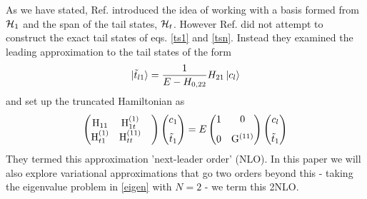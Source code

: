 \documentclass[twocolumn,secnumarabic,amssymb, nobibnotes, aps, prd]{revtex4-2}
\begin{document}
As we have stated, Ref. \cite{Elias-Miro:2017tup} introduced the idea of working with a basis formed from ${\cal H}_1$ and the span of the tail states, ${\cal H}_t$.  However Ref. \cite{Elias-Miro:2017tup} did not attempt to construct the exact tail states of eqs. \eqref{ts1} and \eqref{tsn}. Instead they examined the leading approximation to the tail states of the form
\begin{equation}
    \ket{\tilde t_{l1}}=\frac{1}{E-H_{0,22} }H_{21}\ket{c_l} \label{NLOtail}
\end{equation}
and set up the truncated Hamiltonian as
\begin{equation}\label{1st_tail_order}
\begin{pmatrix}
   {\rm H}_{11} & {\rm H}_{1t}^{(1)} \\
   {\rm H}_{t1}^{(1)} & {\rm H}_{tt}^{(11)} & \\
    \end{pmatrix}
   \begin{pmatrix}
    c_1 \\[.1in]
    \tilde t_1 \\
\end{pmatrix}
   = E
    \begin{pmatrix}
        1 & 0  \\[.1in]
        0 & {\rm G}^{(11)} \\
  \end{pmatrix}
  \begin{pmatrix}
    c_l \\[.1in]
    \tilde t_1 \\
  \end{pmatrix}
 \end{equation}
They termed this approximation 'next-leader order' (NLO).  In this paper we will also explore variational approximations that go two orders beyond this - taking the eigenvalue problem in \eqref{eigen} with $N=2$ - we term this 2NLO.  
\end{document}

